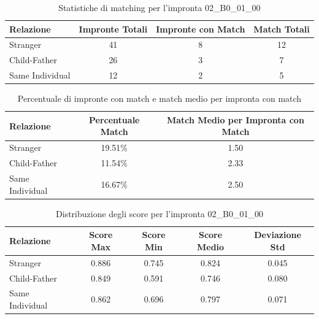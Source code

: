 \begin{table}[htbp]
\centering
\caption{Statistiche di matching per l'impronta 02\_B0\_01\_00}
\label{tab:results_02_B0_01_00}
\begin{tabular}{|l|c|c|c|}
\hline
\textbf{Relazione} & \textbf{Impronte Totali} & \textbf{Impronte con Match} & \textbf{Match Totali} \\
\hline
Stranger & 41 & 8 & 12 \\
\hline
Child-Father & 26 & 3 & 7 \\
\hline
Same Individual & 12 & 2 & 5 \\
\hline
\end{tabular}
\end{table}


\begin{table}[htbp]
\centering
\caption{Percentuale di impronte con match e match medio per impronta con match}
\label{tab:match_percentage_02_B0_01_00}
\begin{tabular}{|l|c|c|}
\hline
\textbf{Relazione} & \textbf{Percentuale Match} & \textbf{Match Medio per Impronta con Match} \\
\hline
Stranger & 19.51\% & 1.50 \\
\hline
Child-Father & 11.54\% & 2.33 \\
\hline
Same Individual & 16.67\% & 2.50 \\
\hline
\end{tabular}
\end{table}


\begin{table}[htbp]
\centering
\caption{Distribuzione degli score per l'impronta 02\_B0\_01\_00}
\label{tab:scores_02_B0_01_00}
\begin{tabular}{|l|c|c|c|c|}
\hline
\textbf{Relazione} & \textbf{Score Max} & \textbf{Score Min} & \textbf{Score Medio} & \textbf{Deviazione Std} \\
\hline
Stranger & 0.886 & 0.745 & 0.824 & 0.045 \\
\hline
Child-Father & 0.849 & 0.591 & 0.746 & 0.080 \\
\hline
Same Individual & 0.862 & 0.696 & 0.797 & 0.071 \\
\hline
\end{tabular}
\end{table}

